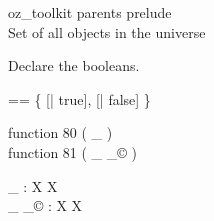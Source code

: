 \zsection oz\_toolkit parents prelude\\

Set of all objects in the universe

\begin{zed}
  [\oid]
\end{zed}

Declare the booleans.

\begin{zed}
  \bool == \{ [| true], [| false] \}
\end{zed}

\begin{zed}
  function 80 ( \poly \_ )\\
  function 81 ( \_ _{\copyright} )
\end{zed}

\begin{gendef}[X]
  \poly \_ : X \fun X\\
  \_ _{\copyright} : X \fun X
\end{gendef}
